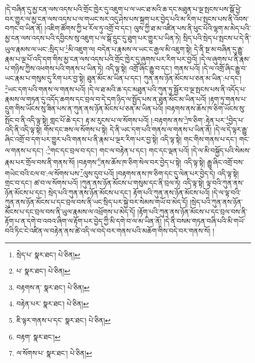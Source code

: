 །དེ་བཞིན་དུ་མྱ་ངན་ལས་འདས་པའི་གྲོང་ཁྱེར་དུ་འཇུག་པ་ལ་ཡང་ཐ་མའི་ཆ་དང་མཐུན་པ་ལྔ་སྤངས་པས་སྒོ་ཕྱེ་བར་གྱུར་ལ་མྱ་ངན་ལས་འདས་པ་ལ་གཡང་སར་འདུ་ཤེས་པས་སྐྲག་པར་བྱེད་པའི་མ་རིག་པ་སྤངས་པས་ནི་འོབས་བཀང་བ་ཡིན་ནོ། །འཇིག་ཚོགས་ཀྱི་ཕ་རོལ་ཏུ་འགྲོ་བ་དང་། ལུས་ཀྱི་ཐ་མ་འཛིན་པས་ནི་ཕུང་པོའི་ལྷག་མ་མེད་པའི་མྱ་ངན་ལས་འདས་པའི་དབྱིངས་སུ་འཇུག་པ་ལ་སྒོ་དྲུང་དུ་ཐུག་པར་གྱུར་པ་ཡིན་ཏེ། སྲིད་པའི་སྲེད་པ་སྤངས་པ་དེ་ནི་ཡུལ་རྣམས་ལ་ཡང་:སྲིད་པ་\footnote{སྲེད་པ་  སྣར་ཐང་།  པེ་ཅིན། }མི་འཇུག་ལ། བདེན་པ་རྣམས་ལ་ཡང་ང་རྒྱལ་མི་འཇུག་སྟེ། དེ་ནི་སྔ་མ་བཞིན་དུ་རྒྱུ་རྣམ་པ་ལྔ་པོ་འདི་དག་གིས་མྱ་ངན་ལས་འདས་པའི་གྲོང་ཁྱེར་དུ་ཞུགས་པར་རིག་པར་བྱའོ། །དེ་ལ་ཞུགས་པ་ནི་རྣམ་པ་གཉིས་ཀྱིས་འཕགས་པའི་གནས་པ་ཡིན་ཏེ། འདི་ལྟ་སྟེ། འགྲོ་ཞིང་རྒྱུ་བ་དང་། གནས་པའོ། །དེ་ལ་འགྲོ་ཞིང་རྒྱུ་བ་ཡང་རྣམ་པ་གསུམ་དུ་རིག་པར་བྱ་སྟེ། ཐུན་མོང་མ་ཡིན་པ་དང་། ཀུན་ནས་ཉོན་མོངས་པ་ཅན་མ་ཡིན་:པ་དང་། \footnote{པ་  སྣར་ཐང་།  པེ་ཅིན། }ཡང་དག་པའི་གནས་ལ་གནས་པའོ། །དེ་ལ་ཐ་མའི་ཆ་དང་མཐུན་པའི་ཀུན་ཏུ་སྦྱོར་བ་ལྔ་སྤངས་པས་ནི་འདོད་པ་རྣམས་ལ་གཏན་དུ་འདོད་ཆགས་དང་བྲལ་བ་དེ་དག་ཉིད་ལ་སྤྱོད་པས་ན་ཐུན་མོང་མ་ཡིན་པའོ། །རྟག་ཏུ་གནས་པ་དྲུག་གིས་ཡོངས་སུ་ཟིན་པས་ན་ཀུན་ནས་ཉོན་མོངས་པ་ཅན་མ་ཡིན་པའོ། །བརྟགས་ནས་ཆོས་ཁ་ཅིག་ཡོངས་སུ་སྤོང་བ་ནི་འདི་ལྟ་སྟེ། གླང་པོ་ཆེ་དང་། རྟ་མ་རུངས་པ་ལ་སོགས་པའོ། །:བརྟགས་ནས་\footnote{བརྟགས་ན་  སྣར་ཐང་།  པེ་ཅིན། }ཁ་ཅིག་:རྟེན་པར་\footnote{བརྟེན་པར་  སྣར་ཐང་།  པེ་ཅིན། }བྱེད་པ་འདི་ནི་འདི་ལྟ་སྟེ། གོས་དང་ཟས་ལ་སོགས་པ་སྟེ། དེ་ནི་ཡང་དག་པའི་གནས་ལ་གནས་པ་ཡིན་ནོ། །དེ་ལ་དེ་ལྟར་རྒྱུ་ཞིང་འགྲོ་བ་དག་པར་གྱུར་པའི་གནས་པ་ནི་རྣམ་པ་ལྔར་རིག་པར་བྱ་སྟེ། འདི་ལྟ་སྟེ། གང་གིས་གནས་པ་དང་། གང་ལ་གནས་པ་དང་། :\footnote{ཇི་ལྟར་གནས་པ་དང་  སྣར་ཐང་།  པེ་ཅིན། }གང་དང་བྲལ་བ་དང་། གང་ལ་བརྟེན་པ་དང་། གང་དང་ལྡན་པའོ། །དེ་ལ་མི་བསྐྱོད་པའི་སེམས་རྣམ་པར་གྲོལ་བས་ནི་གནས་སོ། །བརྟགས་\footnote{བརྟག་  སྣར་ཐང་། }ནས་ཆོས་ཁ་ཅིག་སེལ་བར་བྱེད་པ་སྟེ། འདི་ལྟ་སྟེ། རྒྱུ་ཞིང་འགྲོ་བས་གཡེང་བའི་ངལ་བ་:ལ་སོགས་པས་\footnote{ལ་སོགས་པ་  སྣར་ཐང་།  པེ་ཅིན། }ལུས་དུབ་པའོ། །བརྟགས་ནས་ཁ་ཅིག་དང་དུ་ལེན་པར་བྱེད་དེ། འདི་ལྟ་སྟེ། གྲང་བ་དང་། ཚ་བ་ལ་སོགས་པའོ། །ཀུན་ནས་ཉོན་མོངས་པ་གསུམ་དང་ནི་བྲལ་ཏེ། འདི་ལྟ་སྟེ། ལྟ་བའི་ཀུན་ནས་ཉོན་མོངས་པ་དང་། སྲེད་པའི་ཀུན་ནས་ཉོན་མོངས་པ་དང་། རྟོག་པའི་ཀུན་ནས་ཉོན་མོངས་པའོ། །དེ་ལ་ལྟ་བའི་ཀུན་ནས་ཉོན་མོངས་པ་དང་བྲལ་བས་ནི་ཡང་སྲིད་པར་སྐྱེ་བར་སེམས་གཡོ་བ་མེད་དོ། །སྲེད་པའི་ཀུན་ནས་ཉོན་མོངས་པ་དང་བྲལ་བས་ནི་ཡུལ་རྣམས་ལ་འཕྲོགས་པ་མེད་དོ། །རྟོག་པའི་ཀུན་ནས་ཉོན་མོངས་པ་དང་བྲལ་བས་ནི་རྟོག་པ་ན་དགེ་བ་འབའ་ཞིག་ལ་རྟོག་པར་བྱེད་ཀྱི་མི་དགེ་བ་ལ་མ་ཡིན་ནོ། །དེ་ནི་བསམ་གཏན་བཞི་པའི་མི་གཡོ་བའི་ཏིང་ངེ་འཛིན་ལ་བརྟེན་ནས་ཚེ་འདི་ལ་བདེ་བར་གནས་པའི་མཆོག་གིས་བདེ་བར་གནས་སོ། །
